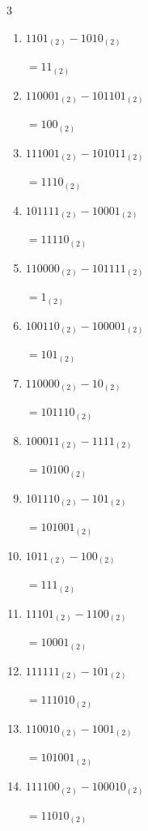 \begin{multicols}{3}
\begin{enumerate}
  \item $1101_{(2)} - 1010_{(2)}$

        $=11_{(2)}$

  \item $110001_{(2)} - 101101_{(2)}$

        $=100_{(2)}$

  \item $111001_{(2)} - 101011_{(2)}$

        $=1110_{(2)}$

  \item $101111_{(2)} - 10001_{(2)}$

        $=11110_{(2)}$

\columnbreak %

\resetques

  \item $110000_{(2)} - 101111_{(2)}$

        $=1_{(2)}$

  \item $100110_{(2)} - 100001_{(2)}$

        $=101_{(2)}$

  \item $110000_{(2)} - 10_{(2)}$

        $=101110_{(2)}$

  \item $100011_{(2)} - 1111_{(2)}$

        $=10100_{(2)}$

  \item $101110_{(2)} - 101_{(2)}$

        $=101001_{(2)}$

  \item $1011_{(2)} - 100_{(2)}$

        $=111_{(2)}$

  \item $11101_{(2)} - 1100_{(2)}$

        $=10001_{(2)}$

  \item $111111_{(2)} - 101_{(2)}$

        $=111010_{(2)}$

  \item $110010_{(2)} - 1001_{(2)}$

        $=101001_{(2)}$

  \item $111100_{(2)} - 100010_{(2)}$

        $=11010_{(2)}$


\end{enumerate}
\end{multicols}
